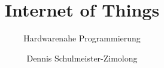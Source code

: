 \title{Internet of Things}
\subtitle{Hardwarenahe Programmierung}
\author{Dennis Schulmeister-Zimolong}

\renewcommand{\ubInstitute}{Studiengang Mechatronik}
\renewcommand{\ubModule}{Internet of Things}
\renewcommand{\ubType}{Aufgaben}
